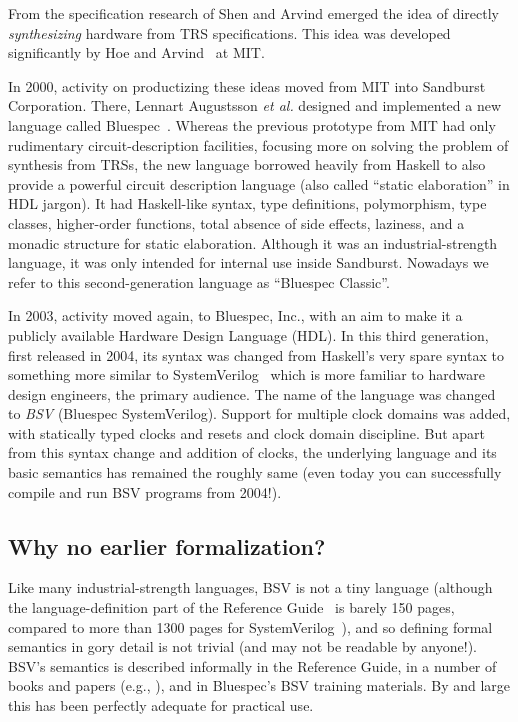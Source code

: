 \documentclass[11pt]{article}
\begin{document}
From the specification research of Shen and Arvind emerged the idea of
directly \emph{synthesizing} hardware from TRS specifications.  This
idea was developed significantly by Hoe and Arvind~\cite{Hoe2000a,
Hoe2000b,Hoe2004a} at MIT.

In 2000, activity on productizing these ideas moved from MIT into
Sandburst Corporation.  There, Lennart Augustsson \emph{et al.}
designed and implemented a new language called
Bluespec~\cite{Augustsson2001a}.  Whereas the previous prototype from
MIT had only rudimentary circuit-description facilities, focusing more
on solving the problem of synthesis from TRSs, the new language
borrowed heavily from Haskell to also provide a powerful circuit
description language (also called ``static elaboration'' in HDL
jargon).  It had Haskell-like syntax, type definitions, polymorphism,
type classes, higher-order functions, total absence of side effects,
laziness, and a monadic structure for static elaboration.  Although it
was an industrial-strength language, it was only intended for internal
use inside Sandburst.  Nowadays we refer to this second-generation
language as ``Bluespec Classic''.

In 2003, activity moved again, to Bluespec, Inc., with an aim to make
it a publicly available Hardware Design Language (HDL).  In this third
generation, first released in 2004, its syntax was changed from
Haskell's very spare syntax to something more similar to
SystemVerilog~\cite{IEEESystemVerilog2012a} which is more familiar to
hardware design engineers, the primary audience. The name of the
language was changed to \emph{BSV} (Bluespec SystemVerilog).  Support
for multiple clock domains was added, with statically typed clocks and
resets and clock domain discipline.  But apart from this syntax change
and addition of clocks, the underlying language and its basic
semantics has remained the roughly same (even today you can
successfully compile and run BSV programs from 2004!).


\subsection{Why no earlier formalization?}

\noindent Like many industrial-strength languages, BSV is not a tiny
language (although the language-definition part of the Reference
Guide~\cite{Bluespec2015} is barely 150 pages, compared to more than
1300 pages for SystemVerilog~\cite{IEEESystemVerilog2012a}), and so
defining formal semantics in gory detail is not trivial (and may not
be readable by anyone!).  BSV's semantics is described informally in
the Reference Guide, in a number of books and papers (e.g.,
\cite{Nikhil2008a, Nikhil2010a, Nikhil2011b, Nikhil2013}), and in
Bluespec's BSV training materials.  By and large this has been
perfectly adequate for practical use.
\end{document}
